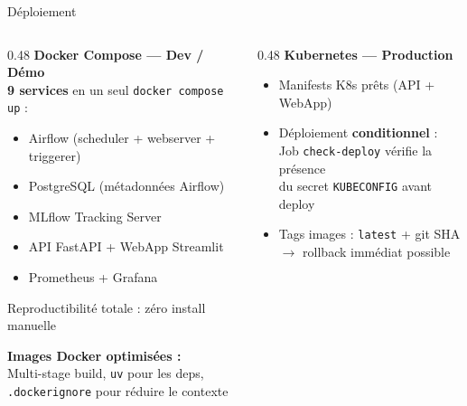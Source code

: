 \documentclass[aspectratio=169, 11pt]{beamer}
\begin{document}
\begin{frame}[fragile]{D\'eploiement}

\begin{columns}[T]
  \begin{column}{0.48\textwidth}
    \textbf{\faDocker\hspace{4pt}Docker Compose --- Dev / D\'emo}\\[4pt]
    \small
    \textbf{9 services} en un seul \texttt{docker compose up} :
    \begin{itemize}\setlength\itemsep{1pt}
      \item Airflow (scheduler + webserver + triggerer)
      \item PostgreSQL (m\'etadonn\'ees Airflow)
      \item MLflow Tracking Server
      \item API FastAPI + WebApp Streamlit
      \item Prometheus + Grafana
    \end{itemize}
    \vspace{2pt}
    {\scriptsize\color{tptgray}\faArrowRight\hspace{4pt} Reproductibilit\'e totale : z\'ero install manuelle}

    \vspace{4pt}
    \textbf{Images Docker optimis\'ees :}\\
    {\scriptsize Multi-stage build, \texttt{uv} pour les deps,\\\texttt{.dockerignore} pour r\'eduire le contexte}
  \end{column}

  \begin{column}{0.48\textwidth}
    \textbf{\faCloud\hspace{4pt}Kubernetes --- Production}\\[4pt]
    \small
    \begin{itemize}\setlength\itemsep{2pt}
      \item Manifests K8s pr\^ets (API + WebApp)
      \item D\'eploiement \textbf{conditionnel} :\\{\scriptsize Job \texttt{check-deploy} v\'erifie la pr\'esence\\du secret \texttt{KUBECONFIG} avant deploy}
      \item Tags images : \texttt{latest} + git SHA\\{\scriptsize $\to$ rollback imm\'ediat possible}
    \end{itemize}


\end{column}
\end{columns}
\end{frame}
\end{document}
